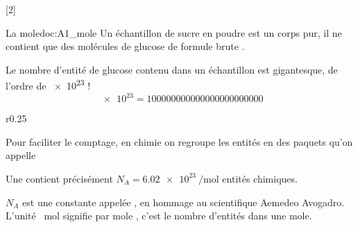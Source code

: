 [2]


\begin{doc}{La mole}{doc:A1_mole}
  Un échantillon de sucre en poudre est un corps pur, il ne contient que des molécules de glucose de formule brute .

  Le nombre d'entité de glucose contenu dans un échantillon est gigantesque, de l'ordre de \num{e23} !
  \begin{equation*}
    \num{e23} = \num{100 000 000 000 000 000 000 000}
  \end{equation*}

  \begin{wrapfigure}{r}{0.25\linewidth}
    \centering \vspace*{-50pt}
     \\[4pt]
  \end{wrapfigure}
  Pour faciliter le comptage, en chimie on regroupe les entités en des paquets qu'on appelle 
  \begin{importants}
    Une  contient précisément $N_A = \qty{6,02 e23}{\per\mole}$ entités chimiques.
  \end{importants}
  \attention $N_A$ est une constante appelée , en hommage au scientifique Aemedeo Avogadro.
  L'unité \og \unit{\per\mole} \fg\! signifie \og par mole \fg, c’est le nombre d'entités dans une mole.
\end{doc}

